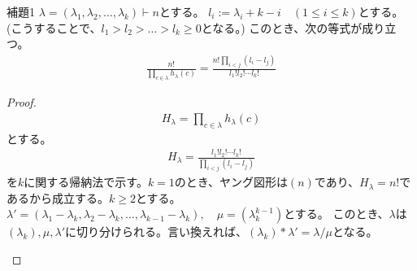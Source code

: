 \documentclass[a4paper,11pt]{jsarticle}
\theoremstyle{plain}
\theoremstyle{definition}
\renewcommand{\(}{\left(}
\renewcommand{\)}{\right)}
\renewcommand{\[}{\left[}
\renewcommand{\]}{\right]}
\renewcommand{\{}{\left\lbrace}
\renewcommand{\}}{\right\rbrace}
\begin{document}
\begin{itembox}[l]{補題1}
    $\lambda = (\lambda_1, \lambda_2, \ldots, \lambda_k) \vdash n$とする。
    $l_i:= \lambda_i + k - i \quad (1 \leq i \leq k)$とする。\\
    (こうすることで、$l_1 > l_2 > \ldots > l_k \geq 0$となる。)
    このとき、次の等式が成り立つ。
    \begin{align*}
        \frac{n!}{ \displaystyle \prod_{c \in \lambda} h_{\lambda}(c)} = \frac{n! \displaystyle \prod_{i<j}(l_i-l_j)}{l_1! l_2! \cdots l_k!}
    \end{align*}
\end{itembox}

\begin{proof}
    \begin{align*}
        H_\lambda = \prod_{c \in \lambda} h_{\lambda}(c)
    \end{align*}
    とする。
    \begin{align*}
        H_\lambda = \frac{l_1! l_2! \cdots l_k!}{\prod_{i<j}(l_i-l_j)}
    \end{align*}
    を$k$に関する帰納法で示す。$k=1$のとき、ヤング図形は$(n)$であり、$H_\lambda = n!$であるから成立する。$k \geq 2$とする。
    $\lambda' = (\lambda_1 - \lambda_k, \lambda_2 - \lambda_k, \ldots, \lambda_{k-1} - \lambda_k), \quad \mu = (\lambda_k^{k-1})$とする。
    このとき、$\lambda$は$(\lambda_k), \mu, \lambda'$に切り分けられる。言い換えれば、$(\lambda_k) \ast \lambda' = \lambda / \mu$となる。\\
    \begin{figure}[H]
        \begin{center}
        \end{center}
    \end{figure}

\end{proof}
\end{document}
